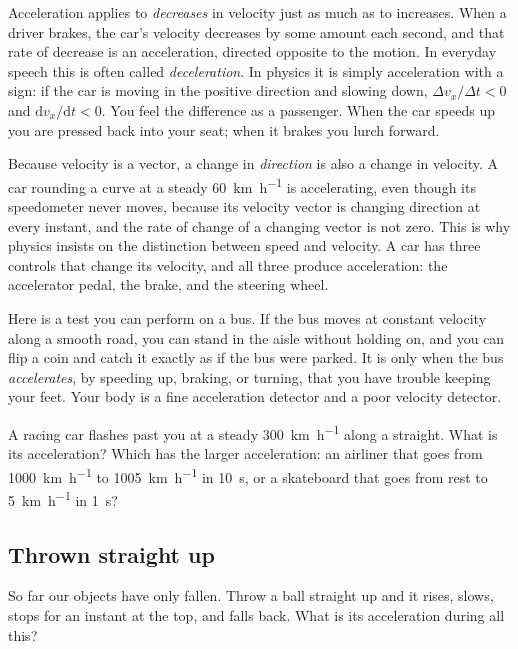 \documentclass[11pt,twoside,openany]{book}
\newcommand{\dd}{\mathrm{d}}
\newcounter{check}[chapter]
\begin{document}
Acceleration applies to \emph{decreases} in velocity just as much as to increases. When a driver brakes, the car's velocity decreases by some amount each second, and that rate of decrease is an acceleration, directed opposite to the motion. In everyday speech this is often called \emph{deceleration}. In physics it is simply acceleration with a sign: if the car is moving in the positive direction and slowing down, $\Delta v_x/\Delta t < 0$ and $\dd v_x/\dd t < 0$. You feel the difference as a passenger. When the car speeds up you are pressed back into your seat; when it brakes you lurch forward.

Because velocity is a vector, a change in \emph{direction} is also a change in velocity. A car rounding a curve at a steady \SI{60}{\kilo\metre\per\hour} is accelerating, even though its speedometer never moves, because its velocity vector is changing direction at every instant, and the rate of change of a changing vector is not zero. This is why physics insists on the distinction between speed and velocity. A car has three controls that change its velocity, and all three produce acceleration: the accelerator pedal, the brake, and the steering wheel.

Here is a test you can perform on a bus. If the bus moves at constant velocity along a smooth road, you can stand in the aisle without holding on, and you can flip a coin and catch it exactly as if the bus were parked. It is only when the bus \emph{accelerates}, by speeding up, braking, or turning, that you have trouble keeping your feet. Your body is a fine acceleration detector and a poor velocity detector.

\begin{checkbox}
A racing car flashes past you at a steady \SI{300}{\kilo\metre\per\hour} along a straight. What is its acceleration? Which has the larger acceleration: an airliner that goes from \SI{1000}{\kilo\metre\per\hour} to \SI{1005}{\kilo\metre\per\hour} in \SI{10}{\second}, or a skateboard that goes from rest to \SI{5}{\kilo\metre\per\hour} in \SI{1}{\second}?
\end{checkbox}

\subsection{Thrown straight up}

So far our objects have only fallen. Throw a ball straight up and it rises, slows, stops for an instant at the top, and falls back. What is its acceleration during all this?
\end{document}
